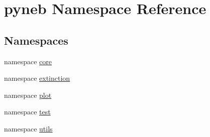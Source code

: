\hypertarget{namespacepyneb}{\section{pyneb Namespace Reference}
\label{namespacepyneb}
}
\subsection*{Namespaces}
\begin{DoxyCompactItemize}
\item 
namespace \hyperlink{namespacepyneb_1_1core}{core}
\item 
namespace \hyperlink{namespacepyneb_1_1extinction}{extinction}
\item 
namespace \hyperlink{namespacepyneb_1_1plot}{plot}
\item 
namespace \hyperlink{namespacepyneb_1_1test}{test}
\item 
namespace \hyperlink{namespacepyneb_1_1utils}{utils}
\end{DoxyCompactItemize}
